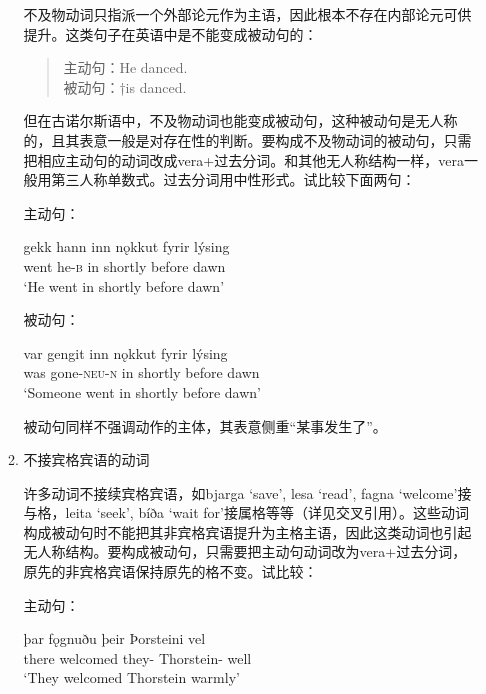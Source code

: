 \begin{enumerate}
\begin{enumerate}
                    不及物动词只指派一个外部论元作为主语，因此根本不存在内部论元可供提升。这类句子在英语中是不能变成被动句的：
                    \begin{quote}
                        主动句：He danced.\\
                        被动句：†is danced.
                    \end{quote}

                    但在古诺尔斯语中，不及物动词也能变成被动句，这种被动句是无人称的，且其表意一般是对存在性的判断。要构成不及物动词的被动句，只需把相应主动句的动词改成vera+过去分词。和其他无人称结构一样，vera一般用第三人称单数式。过去分词用中性形式。试比较下面两句：

                    主动句：
                    \begin{exe}
                        \ex \gll
                        gekk	hann	inn	nǫkkut	fyrir	lýsing\\
                        went	he-\textsc{b}	in	shortly	before	dawn\\
                        \trans `He went in shortly before dawn’
                    \end{exe}

                    被动句：
                    \begin{exe}
                        \ex \gll
                        var	gengit	inn	nǫkkut	fyrir	lýsing\\
                        was	gone-\textsc{\MakeLowercase{NEU-N}}	in	shortly	before	dawn\\
                        \trans `Someone went in shortly before dawn’
                    \end{exe}

                    被动句同样不强调动作的主体，其表意侧重“某事发生了”。
              \item 不接宾格宾语的动词

                    许多动词不接续宾格宾语，如bjarga `save’, lesa `read’, fagna `welcome’接与格，leita `seek’, bíða `wait for’接属格等等（详见交叉引用）。这些动词构成被动句时不能把其非宾格宾语提升为主格主语，因此这类动词也引起无人称结构。要构成被动句，只需要把主动句动词改为vera+过去分词，原先的非宾格宾语保持原先的格不变。试比较：

                    主动句：
                    \begin{exe}
                        \ex \gll
                        þar	fǫgnuðu	þeir	Þorsteini	vel\\
                        there	welcomed	they-{\nom}	Thorstein-{\dat}	well\\
                        \trans `They welcomed Thorstein warmly’
                    \end{exe}


\end{enumerate}
\end{enumerate}
